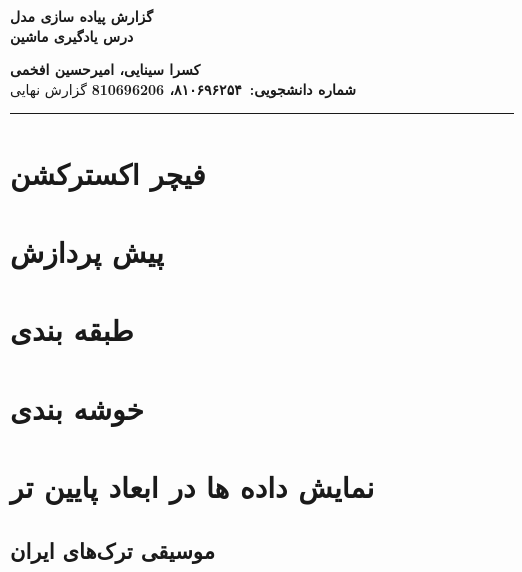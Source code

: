 
\def \Subject {گزارش پیاده سازی مدل }
\def \Course {درس یادگیری ماشین}
\def \Author {کسرا سینایی، امیرحسین افخمی}
\def \Report {گزارش نهایی}
\def \StudentNumber {۸۱۰۶۹۶۲۵۴، 810696206}

\begin{center}
\vspace{.4cm}
{\bf {\huge \Subject}}\\
{\bf \Large \Course}
\vspace{.2cm}
\end{center}
{\bf \Author }  \\
{\bf شماره دانشجویی:\ \StudentNumber}
\hspace{\fill} 
{\Large \Report} \\
\hrule
\vspace{0.8cm}

\clearpage


\section{فیچر اکسترکشن}


\section{پیش پردازش}


\section{طبقه بندی}

\section{خوشه بندی}







\section{نمایش داده ها در ابعاد پایین تر} 

\subsection{موسیقی ترک‌های ایران}

